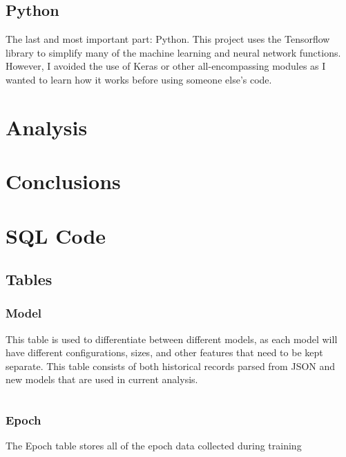 \documentclass[12pt]{article}
\begin{document}
\subsection{Python}

The last and most important part: Python. This project uses the Tensorflow library to simplify many of the machine learning and neural network functions. However, I avoided the use of Keras or other all-encompassing modules as I wanted to learn how it works before using someone else's code. 


\newpage

\section{Analysis}



\newpage


\section{Conclusions}


\newpage

\appendix

\section{SQL Code}

\subsection{Tables}

\subsubsection{Model}

This table is used to differentiate between different models, as each model will have different configurations, sizes, and other features that need to be kept separate. This table consists of both historical records parsed from JSON and new models that are used in current analysis.

\inputminted{SQL}{../../sql/tables/model.sql}

\subsubsection{Epoch}

The Epoch table stores all of the epoch data collected during training
\end{document}
